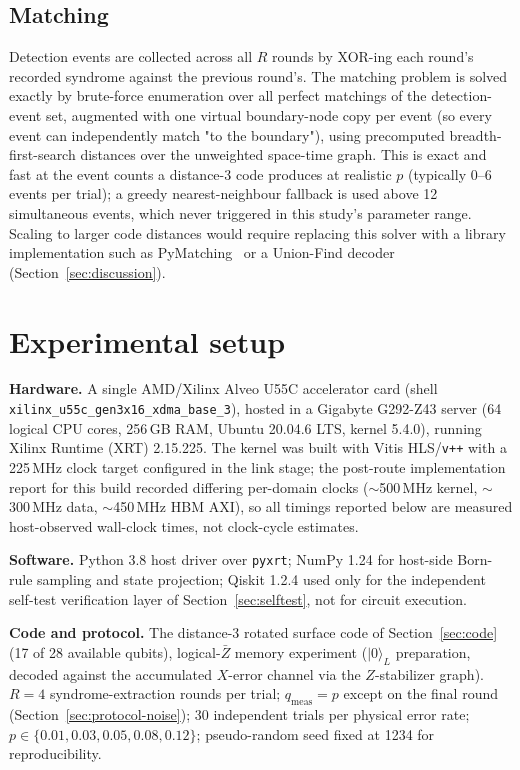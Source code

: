 \documentclass[pdflatex,sn-mathphys,Numbered]{sn-jnl}
\begin{document}
\subsection{Matching}

Detection events are collected across all $R$ rounds by XOR-ing each round's recorded syndrome against the previous round's. The matching problem is solved exactly by brute-force enumeration over all perfect matchings of the detection-event set, augmented with one virtual boundary-node copy per event (so every event can independently match "to the boundary"), using precomputed breadth-first-search distances over the unweighted space-time graph. This is exact and fast at the event counts a distance-3 code produces at realistic $p$ (typically 0--6 events per trial); a greedy nearest-neighbour fallback is used above 12 simultaneous events, which never triggered in this study's parameter range. Scaling to larger code distances would require replacing this solver with a library implementation such as PyMatching~\cite{higgott2022} or a Union-Find decoder~\cite{delfosse2021} (Section~\ref{sec:discussion}).

\section{Experimental setup}\label{sec:setup}

\textbf{Hardware.} A single AMD/Xilinx Alveo U55C accelerator card (shell \texttt{xilinx\_u55c\_gen3x16\_xdma\_base\_3}), hosted in a Gigabyte G292-Z43 server (64 logical CPU cores, 256\,GB RAM, Ubuntu 20.04.6 LTS, kernel 5.4.0), running Xilinx Runtime (XRT) 2.15.225. The kernel was built with Vitis HLS/\texttt{v++} with a 225\,MHz clock target configured in the link stage; the post-route implementation report for this build recorded differing per-domain clocks ($\sim$500\,MHz kernel, $\sim$300\,MHz data, $\sim$450\,MHz HBM AXI), so all timings reported below are measured host-observed wall-clock times, not clock-cycle estimates.

\textbf{Software.} Python 3.8 host driver over \texttt{pyxrt}; NumPy 1.24 for host-side Born-rule sampling and state projection; Qiskit 1.2.4 used only for the independent self-test verification layer of Section~\ref{sec:selftest}, not for circuit execution.

\textbf{Code and protocol.} The distance-3 rotated surface code of Section~\ref{sec:code} (17 of 28 available qubits), logical-$\bar Z$ memory experiment ($\lvert 0\rangle_L$ preparation, decoded against the accumulated $X$-error channel via the $Z$-stabilizer graph). $R=4$ syndrome-extraction rounds per trial; $q_{\mathrm{meas}}=p$ except on the final round (Section~\ref{sec:protocol-noise}); 30 independent trials per physical error rate; $p\in\{0.01,0.03,0.05,0.08,0.12\}$; pseudo-random seed fixed at 1234 for reproducibility.
\end{document}
